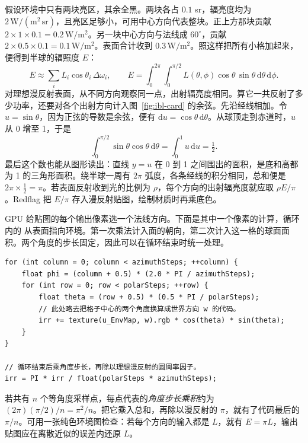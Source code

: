 假设环境中只有两块亮区，其余全黑。两块各占 $0.1$ sr，辐亮度均为 $2\,\mathrm{W/(m^2\,sr)}$，且亮区足够小，可用中心方向代表整块。正上方那块贡献 $2\times1\times0.1=0.2\,\mathrm{W/m^2}$。另一块中心方向与法线成 $60^\circ$，贡献 $2\times0.5\times0.1=0.1\,\mathrm{W/m^2}$。表面合计收到 $0.3\,\mathrm{W/m^2}$。照这样把所有小格加起来，便得到半球的辐照度 $E$：
\[
 E \approx \sum_i L_i\cos\theta_i\,\Delta\omega_i,\qquad
 E=\int_0^{2\pi}\!\int_0^{\pi/2}
    L(\theta,\phi)\cos\theta\,\sin\theta\,\mathrm d\theta\,\mathrm d\phi .
\]
对理想漫反射表面，从不同方向观察同一点，出射辐亮度相同。算它一共反射了多少功率，还要对各个出射方向计入图~\ref{fig:ibl-card} 的余弦。先沿经线相加。令 $u=\sin\theta$，因为正弦的导数是余弦，便有 $\mathrm du=\cos\theta\,\mathrm d\theta$。从球顶走到赤道时，$u$ 从 0 增至 1，于是
\[
\int_0^{\pi/2}\sin\theta\cos\theta\,\mathrm d\theta
=\int_0^1 u\,\mathrm du=\tfrac12 .
\]
最后这个数也能从图形读出：直线 $y=u$ 在 0 到 1 之间围出的面积，是底和高都为 1 的三角形面积。绕半球一周有 $2\pi$ 弧度，各条经线的积分相同，总和便是 $2\pi\times\tfrac12=\pi$。若表面反射收到光的比例为 $\rho$，每个方向的出射辐亮度就应取 $\rho E/\pi$。Redflag 把 $E/\pi$ 存入漫反射贴图，绘制材质时再乘底色。

GPU 给贴图的每个输出像素选一个法线方向。下面是其中一个像素的计算，循环内的  从表面指向环境。第一次乘法计入面的朝向，第二次计入这一格的球面面积。两个角度的步长固定，因此可以在循环结束时统一处理。
\begin{lstlisting}
for (int column = 0; column < azimuthSteps; ++column) {
    float phi = (column + 0.5) * (2.0 * PI / azimuthSteps);
    for (int row = 0; row < polarSteps; ++row) {
        float theta = (row + 0.5) * (0.5 * PI / polarSteps);
        // 此处略去把格子中心的两个角度换算成世界方向 w 的代码。
        irr += texture(u_EnvMap, w).rgb * cos(theta) * sin(theta);
    }
}

// 循环结束后乘角度步长，再除以理想漫反射的圆周率因子。
irr = PI * irr / float(polarSteps * azimuthSteps);
\end{lstlisting}
若共有 $n$ 个等角度采样点，每点代表的\emph{角度步长乘积}约为 $(2\pi)(\pi/2)/n=\pi^2/n$。把它乘入总和，再除以漫反射的 $\pi$，就有了代码最后的 $\pi/n$。可用一张纯色环境图检查：若每个方向的输入都是 $L$，就有 $E=\pi L$，输出贴图应在离散近似的误差内还原 $L$。


